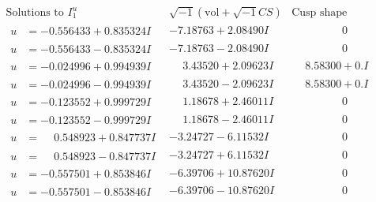 \documentclass[1p]{elsarticle_modified}
\theoremstyle{definition}
\newcommand{\I}{\sqrt{-1}}
\begin{document}
$$\begin{array}{c|c|c}  
\text{Solutions to }I^u_{1}& \I (\text{vol} + \sqrt{-1}CS) & \text{Cusp shape}\\
 \hline 
\begin{aligned}
u &= -0.556433 + 0.835324 I\end{aligned}
 & -7.18763 + 2.08490 I & \phantom{-0.000000 } 0 \\ \hline\begin{aligned}
u &= -0.556433 - 0.835324 I\end{aligned}
 & -7.18763 - 2.08490 I & \phantom{-0.000000 } 0 \\ \hline\begin{aligned}
u &= -0.024996 + 0.994939 I\end{aligned}
 & \phantom{-}3.43520 + 2.09623 I & \phantom{-}8.58300 + 0. I\phantom{ +0.000000I} \\ \hline\begin{aligned}
u &= -0.024996 - 0.994939 I\end{aligned}
 & \phantom{-}3.43520 - 2.09623 I & \phantom{-}8.58300 + 0. I\phantom{ +0.000000I} \\ \hline\begin{aligned}
u &= -0.123552 + 0.999729 I\end{aligned}
 & \phantom{-}1.18678 + 2.46011 I & \phantom{-0.000000 } 0 \\ \hline\begin{aligned}
u &= -0.123552 - 0.999729 I\end{aligned}
 & \phantom{-}1.18678 - 2.46011 I & \phantom{-0.000000 } 0 \\ \hline\begin{aligned}
u &= \phantom{-}0.548923 + 0.847737 I\end{aligned}
 & -3.24727 - 6.11532 I & \phantom{-0.000000 } 0 \\ \hline\begin{aligned}
u &= \phantom{-}0.548923 - 0.847737 I\end{aligned}
 & -3.24727 + 6.11532 I & \phantom{-0.000000 } 0 \\ \hline\begin{aligned}
u &= -0.557501 + 0.853846 I\end{aligned}
 & -6.39706 + 10.87620 I & \phantom{-0.000000 } 0 \\ \hline\begin{aligned}
u &= -0.557501 - 0.853846 I\end{aligned}
 & -6.39706 - 10.87620 I & \phantom{-0.000000 } 0 \\ \hline\begin{aligned}

\end{aligned}
\end{array}$$
\end{document}
